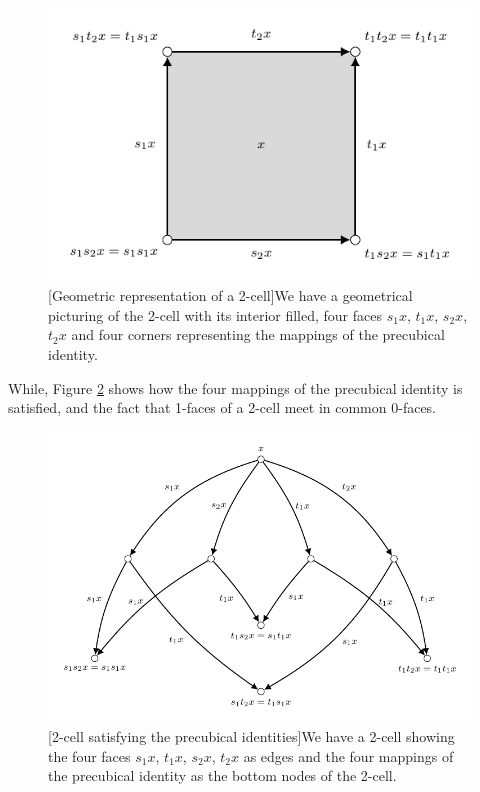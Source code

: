     \begin{figure}[ht]
        \centering
        \includegraphics[scale=1.3]{Figures/3.An-introduction-to-non-interleaving-models-for-concurrency/precubical-square/cubical-law-2-cell-geometrical.pdf}
         [Geometric representation of a 2-cell]{We have a geometrical picturing of the 2-cell with its interior filled, four faces $s_1 x$, $t_1 x$, $s_2 x$, $t_2 x$ and four corners representing the mappings of the precubical identity.}
        \label{fig:precubical-set-interleaving-square-geometric}
    \end{figure}
    
    While, Figure \ref{fig:precubical-set-interleaving-square-preidentity} shows how the four mappings of the precubical identity is satisfied, and the fact that 1-faces of a 2-cell meet in common 0-faces.
    
    \begin{figure}[ht]
        \centering
        \includegraphics[scale=1]{Figures/3.An-introduction-to-non-interleaving-models-for-concurrency/precubical-square/cubical-law-2-cell-preidentity.pdf}
         [2-cell satisfying the precubical identities]{We have a 2-cell showing the four faces $s_1 x$, $t_1 x$, $s_2 x$, $t_2 x$ as edges and the four mappings of the precubical identity as the bottom nodes of the 2-cell.}
        \label{fig:precubical-set-interleaving-square-preidentity}
    \end{figure}
    
